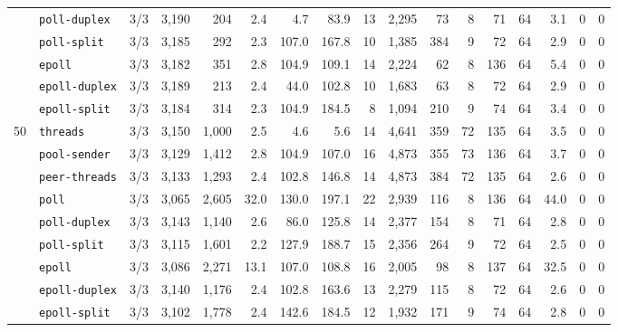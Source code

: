\begin{longtable}{@{}llrrrrrrrrrrrrrrr@{}}
 & \texttt{poll-duplex} & 3/3 & 3{,}190 & 204 & 2.4 & 4.7 & 83.9 & 13 & 2{,}295 & 73 & 8 & 71 & 64 & 3.1 & 0 & 0 \\
 & \texttt{poll-split} & 3/3 & 3{,}185 & 292 & 2.3 & 107.0 & 167.8 & 10 & 1{,}385 & 384 & 9 & 72 & 64 & 2.9 & 0 & 0 \\
 & \texttt{epoll} & 3/3 & 3{,}182 & 351 & 2.8 & 104.9 & 109.1 & 14 & 2{,}224 & 62 & 8 & 136 & 64 & 5.4 & 0 & 0 \\
 & \texttt{epoll-duplex} & 3/3 & 3{,}189 & 213 & 2.4 & 44.0 & 102.8 & 10 & 1{,}683 & 63 & 8 & 72 & 64 & 2.9 & 0 & 0 \\
 & \texttt{epoll-split} & 3/3 & 3{,}184 & 314 & 2.3 & 104.9 & 184.5 & 8 & 1{,}094 & 210 & 9 & 74 & 64 & 3.4 & 0 & 0 \\
\midrule
50 & \texttt{threads} & 3/3 & 3{,}150 & 1{,}000 & 2.5 & 4.6 & 5.6 & 14 & 4{,}641 & 359 & 72 & 135 & 64 & 3.5 & 0 & 0 \\
 & \texttt{pool-sender} & 3/3 & 3{,}129 & 1{,}412 & 2.8 & 104.9 & 107.0 & 16 & 4{,}873 & 355 & 73 & 136 & 64 & 3.7 & 0 & 0 \\
 & \texttt{peer-threads} & 3/3 & 3{,}133 & 1{,}293 & 2.4 & 102.8 & 146.8 & 14 & 4{,}873 & 384 & 72 & 135 & 64 & 2.6 & 0 & 0 \\
 & \texttt{poll} & 3/3 & 3{,}065 & 2{,}605 & 32.0 & 130.0 & 197.1 & 22 & 2{,}939 & 116 & 8 & 136 & 64 & 44.0 & 0 & 0 \\
 & \texttt{poll-duplex} & 3/3 & 3{,}143 & 1{,}140 & 2.6 & 86.0 & 125.8 & 14 & 2{,}377 & 154 & 8 & 71 & 64 & 2.8 & 0 & 0 \\
 & \texttt{poll-split} & 3/3 & 3{,}115 & 1{,}601 & 2.2 & 127.9 & 188.7 & 15 & 2{,}356 & 264 & 9 & 72 & 64 & 2.5 & 0 & 0 \\
 & \texttt{epoll} & 3/3 & 3{,}086 & 2{,}271 & 13.1 & 107.0 & 108.8 & 16 & 2{,}005 & 98 & 8 & 137 & 64 & 32.5 & 0 & 0 \\
 & \texttt{epoll-duplex} & 3/3 & 3{,}140 & 1{,}176 & 2.4 & 102.8 & 163.6 & 13 & 2{,}279 & 115 & 8 & 72 & 64 & 2.6 & 0 & 0 \\
 & \texttt{epoll-split} & 3/3 & 3{,}102 & 1{,}778 & 2.4 & 142.6 & 184.5 & 12 & 1{,}932 & 171 & 9 & 74 & 64 & 2.8 & 0 & 0 \\
\end{longtable}

